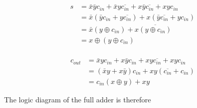 \documentclass[]{article}
\begin{document}
\begin{align*}
	s &= \bar{x}\bar{y}c_{in} + \bar{x}y\overline{c_{in}} + x\bar{y}\overline{c_{in}} + xyc_{in}\\
	&= \bar{x}(\bar{y}c_{in} + y\overline{c_{in}}) + x(\bar{y}\overline{c_{in}} + yc_{in})\\
	&= \bar{x}(y \oplus c_{in}) + x\overline{(y \oplus c_{in})}\\
	&= x \oplus (y \oplus c_{in})\\
\end{align*}


\begin{align*}
	c_{out} &= \bar{x}yc_{in} + x\bar{y}c_{in} + xy\overline{c_{in}} + xyc_{in}\\
	&= (\bar{x}y + x\bar{y})c_{in} + xy(\overline{c_{in}} + c_{in})\\
	&= c_{in}(x \oplus y) + xy
\end{align*}

The logic diagram of the full adder is therefore \\
\end{document}
